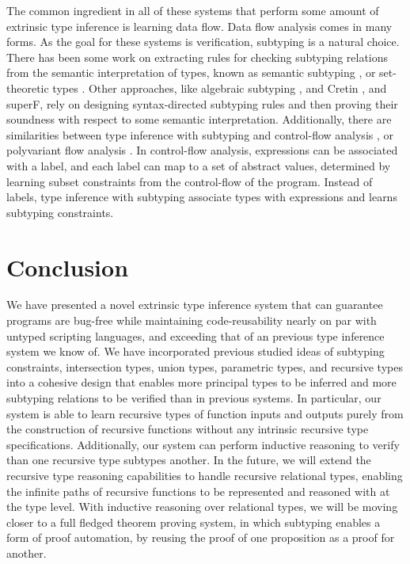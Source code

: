 \documentclass[acmsmall]{acmart}
\theoremstyle{definition}
\begin{document}
The common ingredient in all of these systems that perform some amount of extrinsic type inference is
learning data flow. Data flow analysis comes in many forms. As the goal for these systems is verification,
subtyping is a natural choice. There has been some work on extracting rules for checking subtyping relations
from the semantic interpretation of types, known as semantic subtyping \cite{}, or set-theoretic types \cite{}.
Other approaches, like algebraic subtyping \cite{}, and Cretin \cite{}, and superF, 
rely on designing syntax-directed subtyping rules and then proving their soundness with respect to some semantic interpretation. 
Additionally, there are similarities between type inference with subtyping and control-flow analysis \cite{}, or polyvariant flow analysis \cite{}.
In control-flow analysis, expressions can be associated with a label, and each label can map to a set of abstract values,
determined by learning subset constraints from the control-flow of the program. 
Instead of labels, type inference with subtyping associate types  
with expressions and learns subtyping constraints.





\section{Conclusion}
\label{sec:conclusion}
We have presented a novel extrinsic type inference system
that can guarantee programs are bug-free while maintaining
code-reusability nearly on par with untyped scripting languages,
and exceeding that of an previous type inference system we know of.  
We have incorporated previous studied ideas of subtyping constraints,
intersection types, union types, parametric types, and recursive types into
a cohesive design that enables more principal types to be inferred 
and more subtyping relations to be verified than in previous systems. 
In particular, our system is able to learn recursive types of function inputs
and outputs purely from the construction of recursive functions without 
any intrinsic recursive type specifications.
Additionally, our system can perform inductive reasoning to
verify than one recursive type subtypes another.
In the future, we will extend the recursive type reasoning capabilities
to handle recursive relational types, enabling the infinite paths
of recursive functions to be represented and reasoned with at the type level. 
With inductive reasoning over relational types, we will be
moving closer to a full fledged theorem proving system,
in which subtyping enables a form of proof automation,
by reusing the proof of one proposition as a proof for another. 
\end{document}
